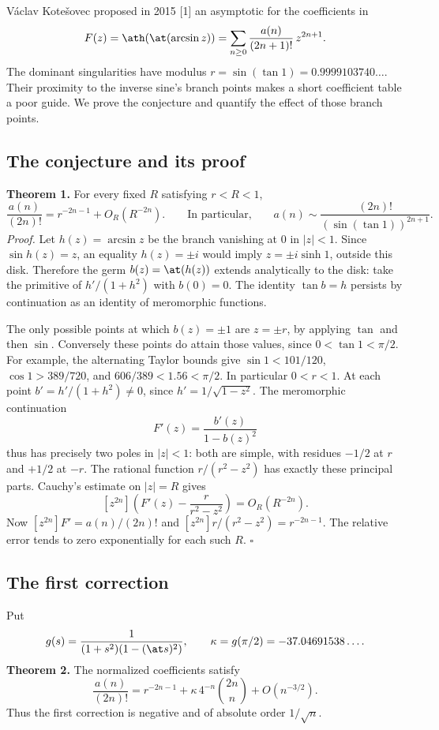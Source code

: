 \documentclass[11pt,a4paper]{article}
\numberwithin{equation}{section}
\theoremstyle{definition}
\theoremstyle{remark}
\begin{document}
V\'aclav Kote\v{s}ovec proposed in 2015 [1] an asymptotic for the coefficients in
\[
 F(z)=\ath(\at(\arcsin z))
     =\sum_{n\ge0}\frac{a(n)}{(2n+1)!}\,z^{2n+1}.
\]
The dominant singularities have modulus $r=\sin(\tan 1)=0.9999103740\ldots$.
Their proximity to the inverse sine's branch points makes a short coefficient table a poor guide. We prove the conjecture and quantify the effect of those branch points.
\subsection*{The conjecture and its proof}
\textbf{Theorem 1.} For every fixed $R$ satisfying $r<R<1$,
\[
 \frac{a(n)}{(2n)!}=r^{-2n-1}+O_R(R^{-2n}).
 \qquad\text{In particular,}\qquad
 a(n)\sim\frac{(2n)!}{(\sin(\tan 1))^{2n+1}} .
\]
\textit{Proof.} Let $h(z)=\arcsin z$ be the branch vanishing at $0$ in $|z|<1$.
Since $\sin h(z)=z$, an equality $h(z)=\pm i$ would imply $z=\pm i\sinh 1$, outside this disk. Therefore the germ $b(z)=\at(h(z))$ extends analytically to the disk: take the primitive of $h'/(1+h^2)$ with $b(0)=0$. The identity $\tan b=h$ persists by continuation as an identity of meromorphic functions.

The only possible points at which $b(z)=\pm1$ are $z=\pm r$, by applying $\tan$ and then $\sin$. Conversely these points do attain those values, since $0<\tan 1<\pi/2$. For example, the alternating Taylor bounds give
$\sin 1<101/120$, $\cos1>389/720$, and $606/389<1.56<\pi/2$.
In particular $0<r<1$. At each point $b'=h'/(1+h^2)\ne0$, since
$h'=1/\sqrt{1-z^2}$. The meromorphic continuation
\[
 F'(z)=\frac{b'(z)}{1-b(z)^2}
\]
thus has precisely two poles in $|z|<1$: both are simple, with residues $-1/2$ at $r$ and $+1/2$ at $-r$. The rational function $r/(r^2-z^2)$ has exactly these principal parts. Cauchy's estimate on $|z|=R$ gives
\[
 [z^{2n}]\!\left(F'(z)-\frac{r}{r^2-z^2}\right)=O_R(R^{-2n}).
\]
Now $[z^{2n}]F'=a(n)/(2n)!$ and $[z^{2n}]r/(r^2-z^2)=r^{-2n-1}$. The relative error tends to zero exponentially for each such $R$. \hfill$\square$


\subsection*{The first correction}
Put
\[
 g(s)=\frac{1}{(1+s^2)(1-(\at s)^2)},\qquad
 \kappa=g(\pi/2)=-37.04691538\ldots.
\]
\textbf{Theorem 2.} The normalized coefficients satisfy
\[
 \frac{a(n)}{(2n)!}
   =r^{-2n-1}+\kappa\,4^{-n}\binom{2n}{n}+O(n^{-3/2}).
\]
Thus the first correction is negative and of absolute order $1/\sqrt{n}$.
\end{document}
